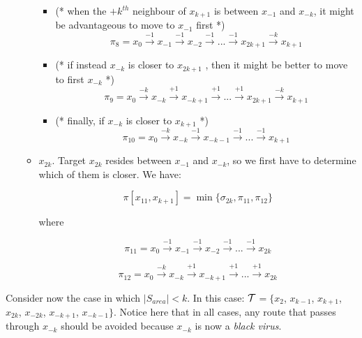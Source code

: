 \begin{enumerate}
\begin{itemize}
\begin{itemize}
\item  (* when the $+k^{th}$ neighbour of $x_{k+1}$  is between $x_{-1}$ and $x_{-k}$, it might be advantageous to move to $x_{-1}$ first *)
   $$ \pi_8 = x_{0} \xrightarrow {-1} x_{-1} \xrightarrow {-1} x_{-2} \xrightarrow {-1} ... \xrightarrow {-1} x_{2k+1}\xrightarrow {-k} x_{k+1}$$ %
\item (*  if instead  $x_{-k}$  is closer to $x_{2k+1}$ , then  it might be better to move to first $x_{-k}$ *)
$$ \pi_9 = x_{0} \xrightarrow {-k} x_{-k} \xrightarrow {+1} x_{-k+1} \xrightarrow {+1} ... \xrightarrow {+1} x_{2k+1}\xrightarrow {-k} x_{k+1}$$ %
 \item (* finally, if $x_{-k}$  is closer to $x_{k+1}$ *)
$$ \pi_{10} = x_{0} \xrightarrow {-k} x_{-k} \xrightarrow {-1} x_{-k-1} \xrightarrow {-1} ... \xrightarrow {-1} x_{k+1}$$ %
\end{itemize}

 
\item $x_{2k}$. Target $x_{2k}$ resides   between $x_{-1}$ and $x_{-k}$, so we first have to determine which of them is closer.  We have: 

$$ \pi[x_{11},x_{k+1}] = \min \{   \sigma_{2k}, \pi_{11}, \pi_{12}\}$$

where

$$\pi_{11} = x_{0} \xrightarrow {-1} x_{-1} \xrightarrow {-1} x_{-2} \xrightarrow {-1} ... \xrightarrow {-1} x_{2k}$$ %

$$\pi_{12} =  x_{0} \xrightarrow {-k} x_{-k} \xrightarrow {+1} x_{-k+1} \xrightarrow {+1} ... \xrightarrow {+1} x_{2k}$$ %
 


\end{itemize}

\end{enumerate}




 
Consider now the case in which
  $\left\vert{S_{area}}\right\vert < k$. In this case: ${\cal T}$$=\{x_{2}$, $x_{k-1}$, $x_{k+1}$, $x_{2k}$, $x_{-2k}$, $x_{-k+1}$, $x_{-k-1}\}$.   Notice here that in all cases,  any route that passes through $x_{-k}$ should be avoided because $x_{-k}$ is now a {\it black virus}. 

